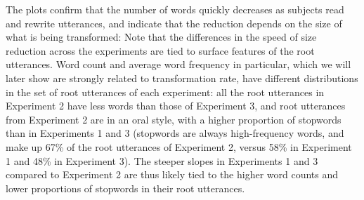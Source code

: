 \documentclass[a4paper,fleqn]{cas-dc}
\begin{document}
The plots confirm that the number of words quickly decreases as subjects
read and rewrite utterances, and indicate that the reduction depends on
the size of what is being transformed:
Note that the differences
in the speed of size reduction across the experiments are tied to
surface features of the root utterances. Word count and average word
frequency in particular, which we will later show are strongly related
to transformation rate, have different distributions in the set of root
utterances of each experiment: all the root utterances in Experiment 2
have less words than those of Experiment 3, and root utterances from
Experiment 2 are in an oral style, with a higher proportion of stopwords
than in Experiments 1 and 3 (stopwords are always high-frequency words,
and make up 67\% of the root utterances of Experiment 2, versus 58\% in
Experiment 1 and 48\% in Experiment 3). The steeper slopes in
Experiments 1 and 3 compared to Experiment 2 are thus likely tied to the higher
word counts and lower proportions of stopwords in their root utterances.
\end{document}

